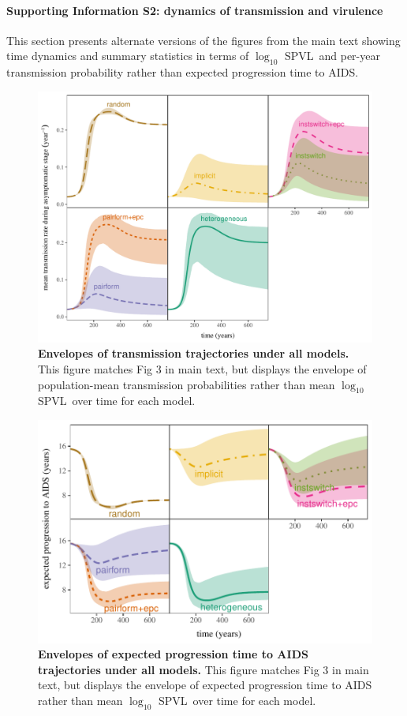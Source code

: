 \documentclass[10pt,letterpaper]{article}
\date{}
\newcommand{\Lspvl}{$\log_{10}$ SPVL}
\begin{document}
\paragraph*{Supporting Information S2: dynamics of transmission and virulence}

This section presents alternate versions of
the figures from the main text showing time dynamics and summary
statistics in terms of \Lspvl\ and per-year transmission probability
rather than expected progression time to AIDS.

\begin{figure}[!ht]
\includegraphics[width=\textwidth]{../figures/fig_S2_1.pdf}
\caption{{\bf Envelopes of transmission trajectories under all models.}
This figure matches Fig 3 in main text, but displays the
envelope of population-mean transmission probabilities rather than mean \Lspvl\ over time
for each model.
}
\label{fig:transtraj}
\end{figure}

\clearpage

\begin{figure}[!ht]
\includegraphics[width=\textwidth]{../figures/fig_S2_2.pdf}
\caption{{\bf Envelopes of expected progression time to AIDS trajectories under all models.}
This figure matches Fig 3 in main text, but displays the
envelope of expected progression time to AIDS rather than mean \Lspvl\ over time
for each model.
}
\label{fig:durtraj}
\end{figure}
\end{document}
